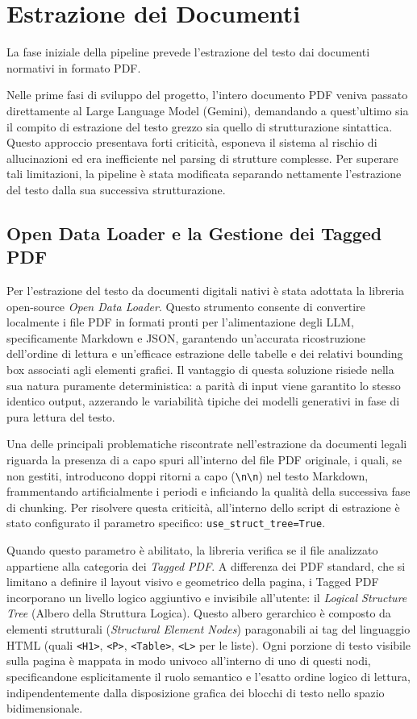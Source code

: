 \section{Estrazione dei Documenti}\label{sec:estrazione_documenti}
La fase iniziale della pipeline prevede l'estrazione del testo dai documenti normativi in formato PDF. 

Nelle prime fasi di sviluppo del progetto, l'intero documento PDF veniva passato direttamente al Large Language Model (Gemini), demandando a quest'ultimo sia il compito di estrazione del testo grezzo sia quello di strutturazione sintattica. Questo approccio presentava forti criticità, esponeva il sistema al rischio di allucinazioni ed era inefficiente nel parsing di strutture complesse. Per superare tali limitazioni, la pipeline è stata modificata separando nettamente l'estrazione del testo dalla sua successiva strutturazione.

\subsection{Open Data Loader e la Gestione dei Tagged PDF}
Per l'estrazione del testo da documenti digitali nativi è stata adottata la libreria open-source \textit{Open Data Loader}. Questo strumento consente di convertire localmente i file PDF in formati pronti per l'alimentazione degli LLM, specificamente Markdown e JSON, garantendo un'accurata ricostruzione dell'ordine di lettura e un'efficace estrazione delle tabelle e dei relativi bounding box associati agli elementi grafici. Il vantaggio di questa soluzione risiede nella sua natura puramente deterministica: a parità di input viene garantito lo stesso identico output, azzerando le variabilità tipiche dei modelli generativi in fase di pura lettura del testo.

Una delle principali problematiche riscontrate nell'estrazione da documenti legali riguarda la presenza di a capo spuri all'interno del file PDF originale, i quali, se non gestiti, introducono doppi ritorni a capo (\texttt{\textbackslash n\textbackslash n}) nel testo Markdown, frammentando artificialmente i periodi e inficiando la qualità della successiva fase di chunking. Per risolvere questa criticità, all'interno dello script di estrazione è stato configurato il parametro specifico: \texttt{use\_struct\_tree=True}.

Quando questo parametro è abilitato, la libreria verifica se il file analizzato appartiene alla categoria dei \textit{Tagged PDF}. A differenza dei PDF standard, che si limitano a definire il layout visivo e geometrico della pagina, i Tagged PDF incorporano un livello logico aggiuntivo e invisibile all'utente: il \textit{Logical Structure Tree} (Albero della Struttura Logica). Questo albero gerarchico è composto da elementi strutturali (\textit{Structural Element Nodes}) paragonabili ai tag del linguaggio HTML (quali \texttt{<H1>}, \texttt{<P>}, \texttt{<Table>}, \texttt{<L>} per le liste). Ogni porzione di testo visibile sulla pagina è mappata in modo univoco all'interno di uno di questi nodi, specificandone esplicitamente il ruolo semantico e l'esatto ordine logico di lettura, indipendentemente dalla disposizione grafica dei blocchi di testo nello spazio bidimensionale.

